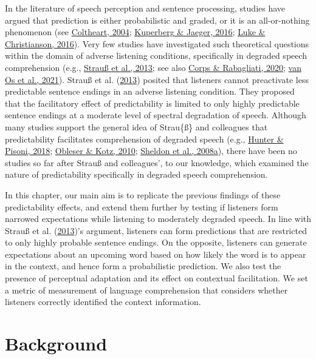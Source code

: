 \documentclass[a4paper, nobind]{templates/ociamthesis}
\begin{document}
In the literature of speech perception and sentence processing, studies have argued that prediction is either probabilistic and graded, or it is an all-or-nothing phenomenon (see \protect\hyperlink{ref-Coltheart2004}{Coltheart, 2004}; \protect\hyperlink{ref-Kuperberg2016}{Kuperberg \& Jaeger, 2016}; \protect\hyperlink{ref-Luke2016}{Luke \& Christianson, 2016}).
Very few studies have investigated such theoretical questions within the domain of adverse listening conditions, specifically in degraded speech comprehension (e.g., \protect\hyperlink{ref-Strauss2013}{Strauß et al., 2013}; see also \protect\hyperlink{ref-Corps2020}{Corps \& Rabagliati, 2020}; \protect\hyperlink{ref-vanOs2021}{van Os et al., 2021}).
Strauß et al. (\protect\hyperlink{ref-Strauss2013}{2013}) posited that listeners cannot preactivate less predictable sentence endings in an adverse listening condition.
They proposed that the facilitatory effect of predictability is limited to only highly predictable sentence endings at a moderate level of spectral degradation of speech.
Although many studies support the general idea of Strau\{\ss\} and colleagues that predictability facilitates comprehension of degraded speech (e.g., \protect\hyperlink{ref-Hunter2018}{Hunter \& Pisoni, 2018}; \protect\hyperlink{ref-Obleser2010}{Obleser \& Kotz, 2010}; \protect\hyperlink{ref-Sheldon2008a}{Sheldon et al., 2008a}),
there have been no studies so far after Strauß and colleagues', to our knowledge, which examined the nature of predictability specifically in degraded speech comprehension.

In this chapter, our main aim is to replicate the previous findings of these predictability effects,
and extend them further by testing if listeners form narrowed expectations while listening to moderately degraded speech.
In line with Strauß et al. (\protect\hyperlink{ref-Strauss2013}{2013})'s argument, listeners can form predictions that are restricted to only highly probable sentence endings.
On the opposite, listeners can generate expectations about an upcoming word based on how likely the word is to appear in the context,
and hence form a probabilistic prediction.
We also test the presence of perceptual adaptation and its effect on contextual facilitation.
We set a metric of measurement of language comprehension that considers whether listeners correctly identified the context information.

\hypertarget{background-1}{%
\section{Background}\label{background-1}}
\end{document}
